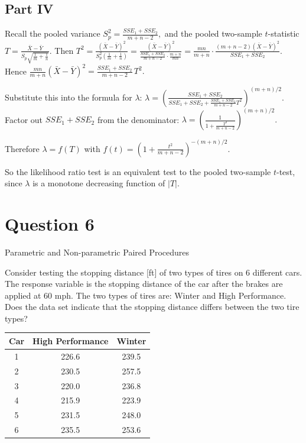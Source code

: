 \documentclass[letterpaper]{article}
\begin{document}
	\clearpage
	
	\subsection{Part IV}
	
	Recall the pooled variance
	$
	S_p^2=\frac{SSE_1+SSE_2}{m+n-2},
	$
	and the pooled two-sample $t$-statistic
	$
	T
	=
	\frac{\bar X-\bar Y}
	{S_p\sqrt{\frac1m+\frac1n}}.
	$
	Then
	$
	T^2
	=
	\frac{(\bar X-\bar Y)^2}
	{S_p^2\left(\frac1m+\frac1n\right)}
	=
	\frac{(\bar X-\bar Y)^2}
	{\frac{SSE_1+SSE_2}{m+n-2}\cdot \frac{m+n}{mn}}
	=
	\frac{mn}{m+n}\cdot \frac{(m+n-2)(\bar X-\bar Y)^2}{SSE_1+SSE_2}.
	$
	Hence
	$
	\frac{mn}{m+n}(\bar X-\bar Y)^2
	=
	\frac{SSE_1+SSE_2}{m+n-2}\,T^2.
	$
	
	Substitute this into the formula for $\lambda$:
	$
	\lambda
	=
	\left(
	\frac{SSE_1+SSE_2}
	{SSE_1+SSE_2+\frac{SSE_1+SSE_2}{m+n-2}T^2}
	\right)^{(m+n)/2}.
	$
	Factor out $SSE_1+SSE_2$ from the denominator:
	$
	\lambda
	=
	\left(
	\frac{1}
	{1+\frac{T^2}{m+n-2}}
	\right)^{(m+n)/2}.
	$
	
	Therefore $\lambda=f(T)$ with
	$
	f(t)=\left(1+\frac{t^2}{m+n-2}\right)^{-(m+n)/2}.
	$
	
	So the likelihood ratio test is an equivalent test to the pooled two-sample $t$-test, since $\lambda$ is a monotone decreasing function of $|T|$.
	
	
	
	
	\clearpage
	
	
	\section{Question 6}
	
	{\color{deepred} Parametric and Non-parametric Paired Procedures}
	
	Consider testing the stopping distance [ft] of two types of tires on 6 different cars. 
	The response variable is the stopping distance of the car after the brakes are applied 
	at 60 mph. The two types of tires are: Winter and High Performance. 
	Does the data set indicate that the stopping distance differs between the two tire types?
	
	\medskip
	
	\begin{center}
		\begin{tabular}{ccc}
			\hline
			Car & High Performance & Winter \\
			\hline
			1 & 226.6 & 239.5 \\
			2 & 230.5 & 257.5 \\
			3 & 220.0 & 236.8 \\
			4 & 215.9 & 223.9 \\
			5 & 231.5 & 248.0 \\
			6 & 235.5 & 253.6 \\
			\hline
		\end{tabular}
	\end{center}
	
\end{document}
